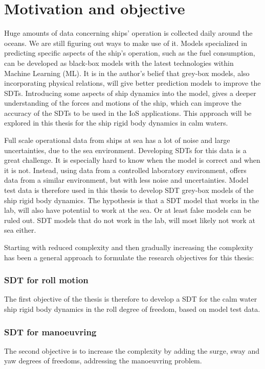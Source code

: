 \section{Motivation and objective}
\label{sec:motivation}
Huge amounts of data concerning ships' operation is collected daily around the oceans. We are still figuring out ways to make use of it. Models specialized in predicting specific aspects of the ship's operation, such as the fuel consumption, can be developed as black-box models with the latest technologies within Machine Learning (ML). It is in the author's belief that grey-box models, also incorporating physical relations, will give better prediction models to improve the SDTs. Introducing some aspects of ship dynamics into the model, gives a deeper understanding of the forces and motions of the ship, which can improve the accuracy of the SDTs to be used in the IoS applications. This approach will be explored in this thesis for the ship rigid body dynamics in calm waters.

Full scale operational data from ships at sea has a lot of noise and large uncertainties, due to the sea environment. Developing SDTs for this data is a great challenge. It is especially hard to know when the model is correct and when it is not. Instead, using data from a controlled laboratory environment, offers data from a similar environment, but with less noise and uncertainties. 
Model test data is therefore used in this thesis to develop SDT grey-box models of the ship rigid body dynamics. The hypothesis is that a SDT model that works in the lab, will also have potential to work at the sea. Or at least false models can be ruled out. SDT models that do not work in the lab, will most likely not work at sea either. 

\bigskip
\noindent Starting with reduced complexity and then gradually increasing the complexity has been a general approach to formulate the research objectives for this thesis:   


\subsubsection*{SDT for roll motion}
The first objective of the thesis is therefore to develop a SDT for the calm water ship rigid body dynamics in the roll degree of freedom, based on model test data.

\subsubsection*{SDT for manoeuvring}
The second objective is to increase the complexity by adding the surge, sway and yaw degrees of freedoms, addressing the manoeuvring problem.

